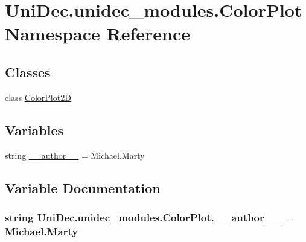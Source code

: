 \hypertarget{namespace_uni_dec_1_1unidec__modules_1_1_color_plot}{}\section{Uni\+Dec.\+unidec\+\_\+modules.\+Color\+Plot Namespace Reference}
\label{namespace_uni_dec_1_1unidec__modules_1_1_color_plot}
\subsection*{Classes}
\begin{DoxyCompactItemize}
\item 
class \hyperlink{class_uni_dec_1_1unidec__modules_1_1_color_plot_1_1_color_plot2_d}{Color\+Plot2\+D}
\end{DoxyCompactItemize}
\subsection*{Variables}
\begin{DoxyCompactItemize}
\item 
string \hyperlink{namespace_uni_dec_1_1unidec__modules_1_1_color_plot_a1fbdfe8b8905214d4a0eee5849a3a794}{\+\_\+\+\_\+author\+\_\+\+\_\+} = \textquotesingle{}Michael.\+Marty\textquotesingle{}
\end{DoxyCompactItemize}


\subsection{Variable Documentation}
\hypertarget{namespace_uni_dec_1_1unidec__modules_1_1_color_plot_a1fbdfe8b8905214d4a0eee5849a3a794}{}
\subsubsection[{\+\_\+\+\_\+author\+\_\+\+\_\+}]{\setlength{\rightskip}{0pt plus 5cm}string Uni\+Dec.\+unidec\+\_\+modules.\+Color\+Plot.\+\_\+\+\_\+author\+\_\+\+\_\+ = \textquotesingle{}Michael.\+Marty\textquotesingle{}}\label{namespace_uni_dec_1_1unidec__modules_1_1_color_plot_a1fbdfe8b8905214d4a0eee5849a3a794}
